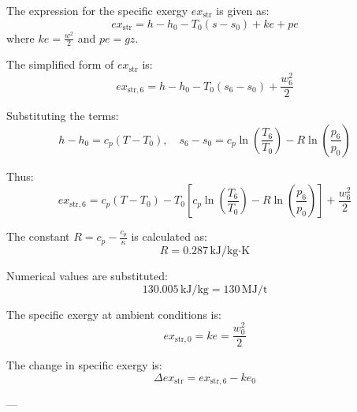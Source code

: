 The expression for the specific exergy \( ex_{\text{str}} \) is given as:  
\[
ex_{\text{str}} = h - h_0 - T_0(s - s_0) + ke + pe
\]  
where \( ke = \frac{w^2}{2} \) and \( pe = gz \).  

The simplified form of \( ex_{\text{str}} \) is:  
\[
ex_{\text{str},6} = h - h_0 - T_0(s_6 - s_0) + \frac{w_6^2}{2}
\]  

Substituting the terms:  
\[
h - h_0 = c_p(T - T_0), \quad s_6 - s_0 = c_p \ln\left(\frac{T_6}{T_0}\right) - R \ln\left(\frac{p_6}{p_0}\right)
\]  

Thus:  
\[
ex_{\text{str},6} = c_p(T - T_0) - T_0 \left[ c_p \ln\left(\frac{T_6}{T_0}\right) - R \ln\left(\frac{p_6}{p_0}\right) \right] + \frac{w_6^2}{2}
\]  

The constant \( R = c_p - \frac{c_p}{\kappa} \) is calculated as:  
\[
R = 0.287 \, \text{kJ/kg·K}
\]  

Numerical values are substituted:  
\[
130.005 \, \text{kJ/kg} = 130 \, \text{MJ/t}
\]  

The specific exergy at ambient conditions is:  
\[
ex_{\text{str},0} = ke = \frac{w_0^2}{2}
\]  

The change in specific exergy is:  
\[
\Delta ex_{\text{str}} = ex_{\text{str},6} - ke_0
\]  

---